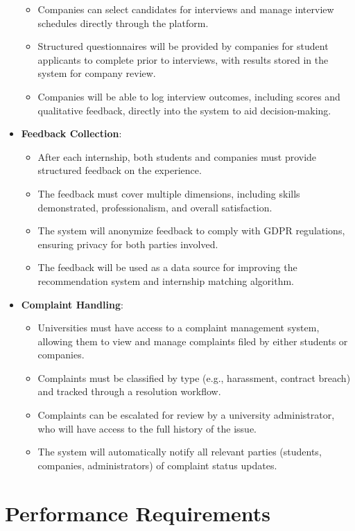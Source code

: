\begin{itemize}
    \begin{itemize}
        \item Companies can select candidates for interviews and manage interview schedules directly through the platform.
        \item Structured questionnaires will be provided by companies for student applicants to complete prior to interviews, with results stored in the system for company review.
        \item Companies will be able to log interview outcomes, including scores and qualitative feedback, directly into the system to aid decision-making.
    \end{itemize}
    \item \textbf{Feedback Collection}:
    \begin{itemize}
        \item After each internship, both students and companies must provide structured feedback on the experience.
        \item The feedback must cover multiple dimensions, including skills demonstrated, professionalism, and overall satisfaction.
        \item The system will anonymize feedback to comply with GDPR regulations, ensuring privacy for both parties involved.
        \item The feedback will be used as a data source for improving the recommendation system and internship matching algorithm.
    \end{itemize}
    \item \textbf{Complaint Handling}:
    \begin{itemize}
        \item Universities must have access to a complaint management system, allowing them to view and manage complaints filed by either students or companies.
        \item Complaints must be classified by type (e.g., harassment, contract breach) and tracked through a resolution workflow.
        \item Complaints can be escalated for review by a university administrator, who will have access to the full history of the issue.
        \item The system will automatically notify all relevant parties (students, companies, administrators) of complaint status updates.
    \end{itemize}
\end{itemize}

\section{Performance Requirements}

